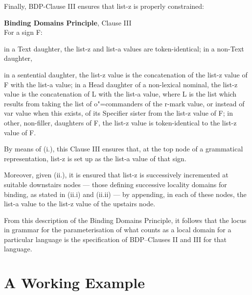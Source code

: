 \documentclass[output=paper
,modfonts
,nonflat]{langsci/langscibook}
\begin{document}
\vspace{.3cm}
Finally, BDP-Clause III ensures that {\sc list-z} is properly
constrained:

\begin{samepage}
\begin{exe}
\ex
\textbf{Binding Domains Principle}, Clause III\\
For a sign F:
\begin{xlisti}
\ex	in a Text daughter, the {\sc list-z} and {\sc list-a} values are token-identical;
\ex	in a non-Text daughter,
\begin{xlisti} 
\ex in a sentential daughter, the {\sc list-z} value is the concatenation of the {\sc
list-z} value of F with the {\sc list-a} value; 
\ex in a Head daughter of a non-lexical nominal, the {\sc list-z} value is the concatenation of L
with the {\sc list-a} value, where L is the list which results from taking the list of
o"=commanders of the {\sc r-mark} value, or instead of {\sc var} value when this exists,
of its Specifier sister from the {\sc list-z} value of F;
\ex in other, non-filler, daughters of F, the {\sc list-z} value is token-iden\-ti\-cal to
the {\sc list-z} value of F.
\end{xlisti}
\end{xlisti}

\end{exe}
\end{samepage}

By means of (i.), this Clause III ensures that, at the top
node of a grammatical representation, {\sc list-z} is set up as the
{\sc list-a} value of that sign. 

Moreover, given (ii.), it is ensured that {\sc list-z} is successively
incremented at suitable downstairs nodes --- those defining
successive locality domains for binding, as stated in (ii.i) and
(ii.ii) --- by appending, 
in each of these nodes, the {\sc list-a} value to the {\sc list-z} value
of the upstairs node.

From this description of the Binding Domains Principle, it follows 
that the locus in grammar for the parameterisation 
of what counts as a local domain for a particular language is 
the specification of BDP--Clauses II and III for that language.



\section{A Working Example \label{verif}}
\end{document}
